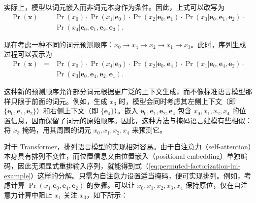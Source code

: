 \noindent 实际上，模型以词元嵌入而非词元本身作为条件。因此，上式可以改写为
\begin{eqnarray}
\Pr(\mathbf{x}) & = & \Pr(x_0) \cdot \Pr(x_1|\mathbf{e}_0) \cdot \Pr(x_2|\mathbf{e}_0,\mathbf{e}_1) \cdot \Pr(x_3|\mathbf{e}_0,\mathbf{e}_1, \mathbf{e}_2) \cdot \nonumber \\
                &   & \Pr(x_4|\mathbf{e}_0, \mathbf{e}_1, \mathbf{e}_2, \mathbf{e}_3).
\end{eqnarray}


现在考虑一种不同的词元预测顺序：$x_0 \to x_4 \to x_2 \to x_1 \to x_3$。此时，序列生成过程可以表示为
\begin{eqnarray}
\Pr(\mathbf{x}) & = & \Pr(x_0) \cdot \Pr(x_4|\mathbf{e}_0) \cdot \Pr(x_2|\mathbf{e}_0, \mathbf{e}_4) \cdot \Pr(x_1|\mathbf{e}_0, \mathbf{e}_4, \mathbf{e}_2) \cdot \nonumber \\
                &   & \Pr(x_3|\mathbf{e}_0, \mathbf{e}_4, \mathbf{e}_2, \mathbf{e}_1) \label{eq:permuted-factorization-lm-example}.
\end{eqnarray}

这种新的预测顺序允许部分词元根据更广泛的上下文生成，而不像标准语言模型那样只限于前面的词元。例如，生成 $x_3$ 时，模型会同时考虑其左侧上下文（即 $\{\mathbf{e}_0, \mathbf{e}_1, \mathbf{e}_2\}$）和右侧上下文（即 $\{\mathbf{e}_4\}$）。嵌入 $\mathbf{e}_0, \mathbf{e}_1, \mathbf{e}_2, \mathbf{e}_4$ 包含 $x_0, x_1, x_2, x_4$ 的位置信息，因而保留了词元的原始顺序。因此，这种方法与掩码语言建模有些相似：将 $x_3$ 掩码，用其周围的词元 $x_0, x_1, x_2, x_4$ 来预测它。

对于 Transformer，排列语言模型的实现相对容易。由于自注意力（self-attention）本身具有排列不变性，而位置信息又由位置嵌入（positional embedding）单独编码，因此无须显式重排输入序列，就能得到式（\ref{eq:permuted-factorization-lm-example}）这样的分解。只需为自注意力设置适当掩码，便可实现排列。例如，考虑计算 $\Pr(x_1 | \mathbf{e}_0, \mathbf{e}_4, \mathbf{e}_2)$ 的步骤。可以让 $x_0, x_1, x_2, x_3, x_4$ 保持原位，仅在自注意力计算中阻止 $x_1$ 关注 $x_3$，如下所示：

